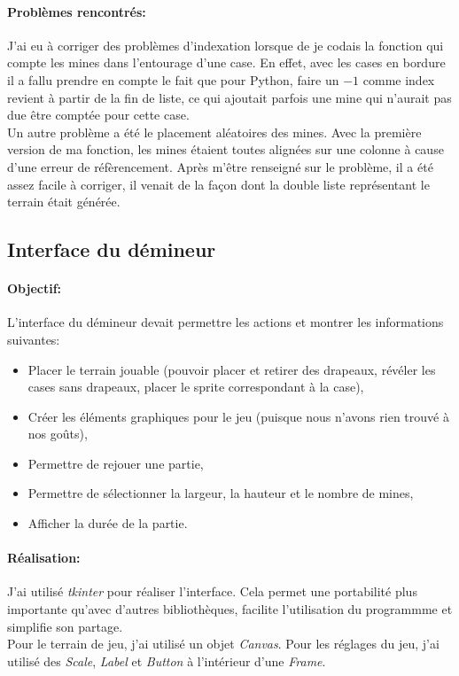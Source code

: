 \documentclass[12pt, a4paper]{article}
\begin{document}
\paragraph{Problèmes rencontrés:}
J'ai eu à corriger des problèmes d'indexation lorsque de je codais la fonction
qui compte les mines dans l'entourage d'une case. En effet, avec les cases en
bordure il a fallu prendre en compte le fait que pour Python, faire un $-1$
comme index revient à partir de la fin de liste, ce qui ajoutait parfois une
mine qui n'aurait pas due être comptée pour cette case. \\
Un autre problème a été le placement aléatoires des mines. Avec la première
version de ma fonction, les mines étaient toutes alignées sur une colonne à
cause d'une erreur de réfèrencement. Après m'être renseigné sur le problème,
il a été assez facile à corriger, il venait de la façon dont la double liste
représentant le terrain était générée.


\subsection{Interface du démineur}

\paragraph{Objectif:}
L'interface du démineur devait permettre les actions et montrer les
informations suivantes:

\begin{itemize}
\item Placer le terrain jouable (pouvoir placer et retirer des drapeaux,
révéler les cases sans drapeaux, placer le sprite correspondant à la case),
\item Créer les éléments graphiques pour le jeu (puisque nous n'avons rien
trouvé à nos goûts),
\item Permettre de rejouer une partie,
\item Permettre de sélectionner la largeur, la hauteur et le nombre de mines,
\item Afficher la durée de la partie.
\end{itemize}

\paragraph{Réalisation:}
J'ai utilisé \emph{tkinter} pour réaliser l'interface. Cela permet une
portabilité plus importante qu'avec d'autres bibliothèques, facilite
l'utilisation du programmme et simplifie son partage. \\
Pour le terrain de jeu, j'ai utilisé un objet \emph{Canvas}. Pour les réglages
du jeu, j'ai utilisé des \emph{Scale}, \emph{Label} et \emph{Button} à
l'intérieur d'une \emph{Frame}.
\end{document}
